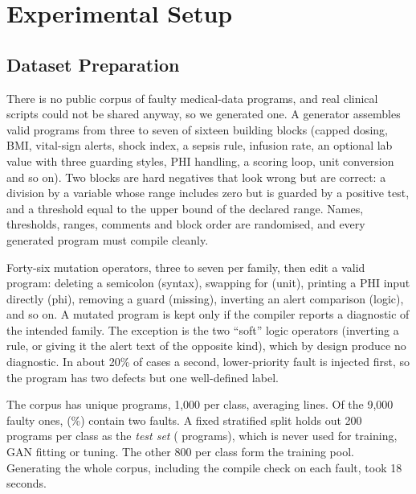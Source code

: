 \section{Experimental Setup}

\subsection{Dataset Preparation}

There is no public corpus of faulty medical-data programs, and real clinical scripts could not be shared anyway, so we
generated one. A generator assembles valid programs from three to seven of sixteen building blocks (capped dosing, BMI,
vital-sign alerts, shock index, a sepsis rule, infusion rate, an optional lab value with three guarding styles, PHI
handling, a scoring loop, unit conversion and so on). Two blocks are hard negatives that look wrong but are correct: a
division by a variable whose range includes zero but is guarded by a positive test, and a threshold equal to the upper
bound of the declared range. Names, thresholds, ranges, comments and block order are randomised, and every generated
program must compile cleanly.

Forty-six mutation operators, three to seven per family, then edit a valid program: deleting a semicolon (syntax),
swapping  for  (unit), printing a PHI input directly (phi), removing a  guard
(missing), inverting an alert comparison (logic), and so on. A mutated program is kept only if the compiler reports a
diagnostic of the intended family. The exception is the two ``soft'' logic operators (inverting a rule, or giving it the
alert text of the opposite kind), which by design produce no diagnostic. In about 20\% of cases a second, lower-priority
fault is injected first, so the program has two defects but one well-defined label.

The corpus has \NProg{} unique programs, 1{,}000 per class, averaging \MeanLoc{} lines. Of the 9{,}000 faulty ones,
\NDouble{} (\DoubleShare\%) contain two faults. A fixed stratified split holds out 200 programs per class as the
\emph{test set} (\NTest{} programs), which is never used for training, GAN fitting or tuning. The other 800 per class form
the training pool. Generating the whole corpus, including the compile check on each fault, took 18 seconds.

